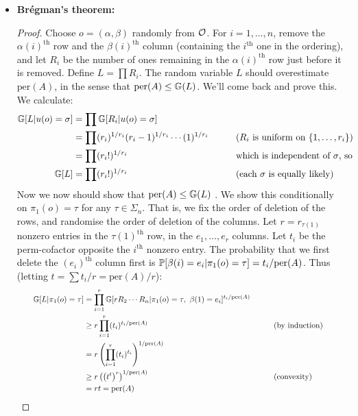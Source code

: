 \documentclass[11pt]{article}
\newenvironment{INT}[1][]{\begin{itemize}\small\item\textbf{#1}}{\end{itemize}}
\begin{document}
\begin{chapter2}
\begin{INT}[Br\'egman's theorem:]
\begin{proof}
\INDENT Choose $o=(\alpha,\beta)$ randomly from $\mathcal{O}$. For $i=1,\ldots, n$, remove the $\alpha(i)^\text{th}$ row and the $\beta(i)^\text{th}$ column (containing the $i^\text{th}$ one in the ordering), and let $R_i$ be the number of ones remaining in the $\alpha(i)^\text{th}$ row just before it is removed. Define $L=\prod R_i$. The random variable $L$ should overestimate $\text{per}(A)$, in the sense that $\text{per}(A)\leq\operatorname{\mathbb{G}}(L)$. We'll come back and prove this. We calculate:
\begin{alignat*}{2}
\GeomMean[L|u(o)=\sigma]&=\prod\GeomMean[R_i|u(o)=\sigma]%
\\&=\prod(r_i)^{1/r_i}(r_i-1)^{1/r_i}\cdots(1)^{1/r_i}&\qquad&\text{($R_i$ is uniform on $\{1,\ldots, r_i\}$)}
\\&=\prod(r_i!)^{1/r_i}&\qquad&\text{which is independent of $\sigma$, so}
\\\GeomMean[L]&=\prod(r_i!)^{1/r_i}&\qquad&\text{(each $\sigma$ is equally likely)}
\end{alignat*}
\INDENT Now we now should show that $\text{per}(A)\leq\operatorname{\mathbb{G}}(L)$	. We show this conditionally on $\pi_1(o)=\tau$ for any $\tau\in\Sigma_n$. That is, we fix the order of deletion of the rows, and randomise the order of deletion of the columns. Let $r=r_{\tau(1)}$ nonzero entries in the $\tau(1)^\text{th}$ row, in the $e_1,\ldots,e_r$ columns. Let $t_i$ be the perm-cofactor opposite the $i^\text{th}$ nonzero entry. The probability that we first delete the $(e_i)^\text{th}$ column first is $\operatorname{\mathbb{P}}[\beta(i)=e_i|\pi_1(o)=\tau]=t_i/\text{per}(A)$. Thus (letting $t=\sum t_i/r=\text{per}(A)/r$):
\begin{alignat*}{3}
\qquad\GeomMean[L|\pi_1(o)=\tau]&=\prod_{i=1}^r\GeomMean[rR_2\cdots R_n|\pi_1(o)=\tau,\ \beta(1)=e_i]^{t_i/\text{per}(A)}%
\\&\geq r\prod_{i=1}^r(t_i)^{t_i/\text{per}(A)} &\qquad&\text{(by induction)}
\\&=r\left(\prod_{i=1}^r(t_i)^{t_i}\right)^{1/\text{per}(A)}%
\\&\geq r\left(\left(t^t\right)^r\right)^{1/\text{per}(A)}&\qquad&\text{(convexity)}
\\&=rt=\text{per}(A)&&&\qquad\qquad\qedhere%
\end{alignat*}
\end{proof}
\end{INT}
\end{chapter2}
\end{document}
